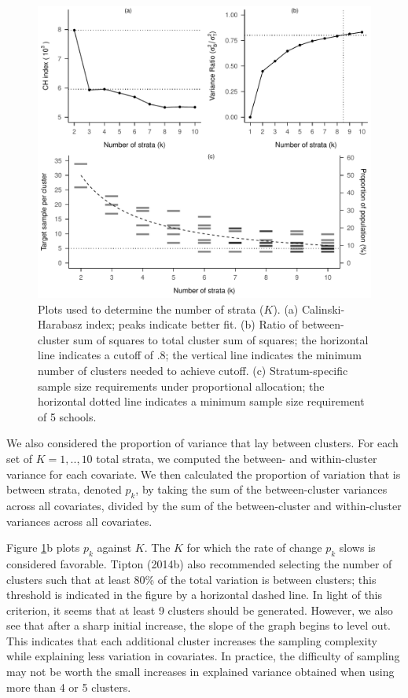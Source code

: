 \documentclass[
  man,floatsintext]{apa6}
\begin{document}
\begin{figure}[p]
\includegraphics[width=1\linewidth]{6---Paper_files/figure-latex/fig-k-plots-1} \caption{Plots used to determine the number of strata (\(K\)). (a) Calinski-Harabasz index; peaks indicate better fit. (b) Ratio of between-cluster sum of squares to total cluster sum of squares; the horizontal line indicates a cutoff of .8; the vertical line indicates the minimum number of clusters needed to achieve cutoff. (c) Stratum-specific sample size requirements under proportional allocation; the horizontal dotted line indicates a minimum sample size requirement of 5 schools. }\label{fig:fig-k-plots}
\end{figure}

We also considered the proportion of variance that lay between clusters. For each set of \(K = 1,..,10\) total strata, we computed the between- and within-cluster variance for each covariate. We then calculated the proportion of variation that is between strata, denoted \(p_k\), by taking the sum of the between-cluster variances across all covariates, divided by the sum of the between-cluster and within-cluster variances across all covariates.

Figure \ref{fig:fig-k-plots}b plots \(p_k\) against \(K\). The \(K\) for which the rate of change \(p_k\) slows is considered favorable. Tipton (2014b) also recommended selecting the number of clusters such that at least 80\% of the total variation is between clusters; this threshold is indicated in the figure by a horizontal dashed line. In light of this criterion, it seems that at least 9 clusters should be generated. However, we also see that after a sharp initial increase, the slope of the graph begins to level out. This indicates that each additional cluster increases the sampling complexity while explaining less variation in covariates. In practice, the difficulty of sampling may not be worth the small increases in explained variance obtained when using more than 4 or 5 clusters.
\end{document}
